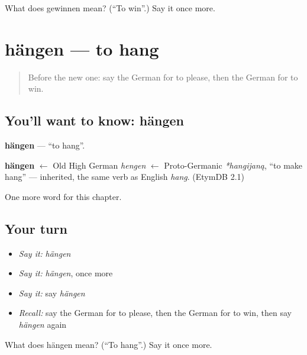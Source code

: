 \begin{tcolorbox}[breakable,colback=teal!4,colframe=teal!35!black,title={Before you move on}]
What does gewinnen mean? (\textquotedblleft{}To win\textquotedblright{}.) Say it once more.
\end{tcolorbox}
\section[hängen]{hängen — to hang}

\label{lesson:GE-C147-haengen}



\begin{quote}
Before the new one: say the German for to please, then the German for to win.
\end{quote}

\subsection*{You'll want to know: hängen}
\textbf{hängen} — \textquotedblleft{}to hang\textquotedblright{}.

\begin{cousinweb}
\textbf{hängen} $\leftarrow$ Old High German \emph{hengen} $\leftarrow$ Proto-Germanic \emph{*hangijaną}, \textquotedblleft{}to make hang\textquotedblright{} — inherited, the same verb as English \emph{hang}. (EtymDB 2.1)
\end{cousinweb}

\begin{grammarlens}[title={What you've built}]
One more word for this chapter.
\end{grammarlens}

\subsection*{Your turn}
\begin{itemize}
\raggedright
  \item \emph{Say it:} \emph{hängen}
  \item \emph{Say it:} \emph{hängen}, once more
  \item \emph{Say it:} say \emph{hängen}
  \item \emph{Recall:} say the German for to please, then the German for to win, then say \emph{hängen} again
\end{itemize}

\begin{tcolorbox}[breakable,colback=teal!4,colframe=teal!35!black,title={Before you move on}]
What does hängen mean? (\textquotedblleft{}To hang\textquotedblright{}.) Say it once more.
\end{tcolorbox}
